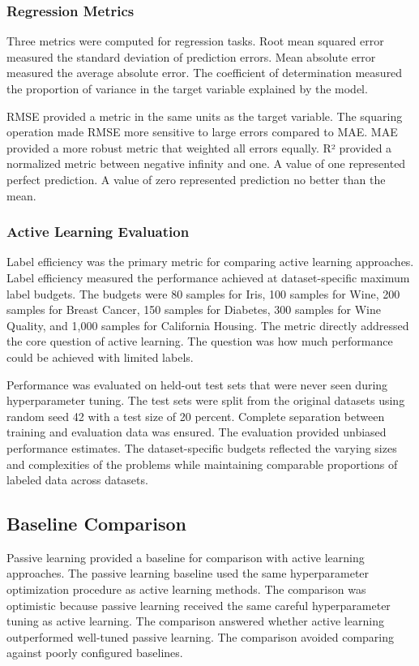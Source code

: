 \documentclass[conference]{IEEEtran}
\begin{document}
\subsubsection{Regression Metrics}

Three metrics were computed for regression tasks. Root mean squared error measured the standard deviation of prediction errors. Mean absolute error measured the average absolute error. The coefficient of determination measured the proportion of variance in the target variable explained by the model.

RMSE provided a metric in the same units as the target variable. The squaring operation made RMSE more sensitive to large errors compared to MAE. MAE provided a more robust metric that weighted all errors equally. R² provided a normalized metric between negative infinity and one. A value of one represented perfect prediction. A value of zero represented prediction no better than the mean.

\subsubsection{Active Learning Evaluation}

Label efficiency was the primary metric for comparing active learning approaches. Label efficiency measured the performance achieved at dataset-specific maximum label budgets. The budgets were 80 samples for Iris, 100 samples for Wine, 200 samples for Breast Cancer, 150 samples for Diabetes, 300 samples for Wine Quality, and 1,000 samples for California Housing. The metric directly addressed the core question of active learning. The question was how much performance could be achieved with limited labels.

Performance was evaluated on held-out test sets that were never seen during hyperparameter tuning. The test sets were split from the original datasets using random seed 42 with a test size of 20 percent. Complete separation between training and evaluation data was ensured. The evaluation provided unbiased performance estimates. The dataset-specific budgets reflected the varying sizes and complexities of the problems while maintaining comparable proportions of labeled data across datasets.

\subsection{Baseline Comparison}

Passive learning provided a baseline for comparison with active learning approaches. The passive learning baseline used the same hyperparameter optimization procedure as active learning methods. The comparison was optimistic because passive learning received the same careful hyperparameter tuning as active learning. The comparison answered whether active learning outperformed well-tuned passive learning. The comparison avoided comparing against poorly configured baselines.
\end{document}
